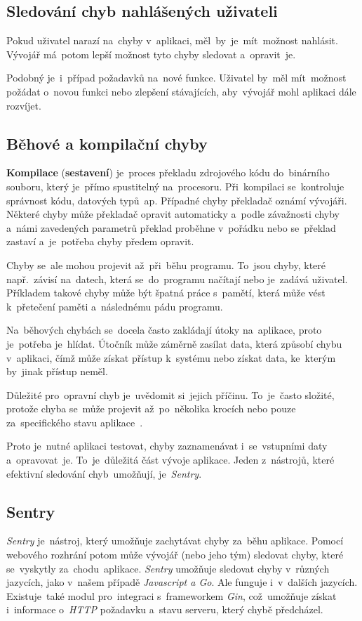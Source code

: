 \documentclass[11pt,a4paper]{report}
\begin{document}
            \subsection{Sledování chyb nahlášených uživateli}
                Pokud uživatel narazí na~chyby v~aplikaci, měl~by~je~mít~možnost nahlásit. Vývojář má~potom lepší možnost tyto chyby sledovat a~opravit~je.

                Podobný je~i~případ požadavků na~nové funkce. Uživatel by~měl mít~možnost požádat o~novou funkci nebo zlepšení stávajících,
                aby~vývojář mohl aplikaci dále rozvíjet.

            \subsection{Běhové a kompilační chyby}
                \textbf{Kompilace} (\textbf{sestavení}) je~proces překladu zdrojového kódu do~binárního souboru, který je~přímo spustitelný na~procesoru. Při~kompilaci se~kontroluje správnost kódu, datových typů~ap. Případné chyby překladač oznámí vývojáři. Některé chyby může překladač opravit automaticky a~podle závažnosti chyby a~námi zavedených parametrů překlad proběhne v~pořádku nebo se~překlad zastaví a~je~potřeba chyby předem opravit.

                Chyby se~ale mohou projevit až~při~běhu programu. To~jsou chyby, které např.~závisí na~datech, která se~do~programu načítají nebo je~zadává uživatel. Příkladem takové chyby může být špatná práce s~pamětí, která může vést k~přetečení paměti a~následnému pádu programu.

                Na~běhových chybách se~docela často zakládají útoky na~aplikace, proto je~potřeba je~hlídat. Útočník může záměrně zasílat data, která způsobí chybu v~aplikaci, čímž může získat přístup k~systému nebo získat data, ke~kterým by~jinak přístup neměl.

                Důležité pro~opravní chyb je~uvědomit si~jejich příčinu. To~je~často složité, protože chyba se~může projevit až~po~několika krocích nebo pouze za~specifického stavu aplikace~\cite{graham2021ethical}.

                Proto je~nutné aplikaci testovat, chyby zaznamenávat i~se~vstupními daty a~opravovat~je. To~je~důležitá část vývoje aplikace. Jeden z~nástrojů, které efektivní sledování chyb~umožňují, je~\emph{Sentry}.

            \subsection{Sentry}
                \emph{Sentry} je~nástroj, který umožňuje zachytávat chyby za~běhu aplikace. Pomocí webového rozhrání potom může vývojář (nebo jeho tým) sledovat chyby, které se~vyskytly za~chodu~aplikace. \emph{Sentry} umožňuje sledovat chyby v~různých jazycích, jako v~našem případě \emph{Javascript a Go}. Ale funguje i~v~dalších jazycích. Existuje~také modul pro~integraci s~frameworkem \emph{Gin}, což~umožňuje získat i~informace o~\emph{HTTP} požadavku a~stavu serveru, který chybě předcházel.
                
\end{document}
